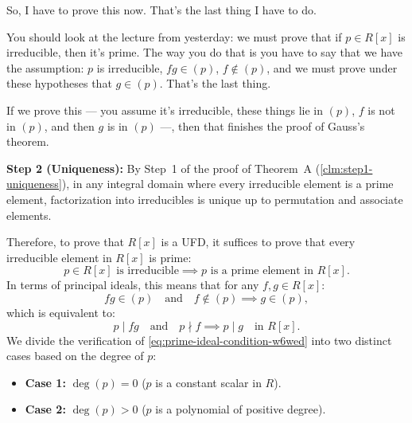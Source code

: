 \begin{proofWrapper}
\begin{speech}[00:31:28 - 00:33:17]
So, I have to prove this now. That's the last thing I have to do.

You should look at the lecture from yesterday: we must prove that if $p \in R[x]$ is irreducible,  then it's prime. The way you do that is you have to say that we have the assumption: $p$ is irreducible, $fg \in (p)$,  $f \notin (p)$,  and we must prove under these hypotheses that $g \in (p)$.  That's the last thing.

If we prove this --- you assume it's irreducible, these things lie in $(p)$, $f$ is not in $(p)$, and then $g$ is in $(p)$ ---, then that finishes the proof of Gauss's theorem.
\end{speech}

\begin{content}
\textbf{Step 2 (Uniqueness):}
By Step~1 of the proof of Theorem~A (\cref{clm:step1-uniqueness}), in any integral domain where every irreducible element is a prime element, factorization into irreducibles is unique up to permutation and associate elements.

Therefore, to prove that $R[x]$ is a UFD, it suffices to prove that every irreducible element in $R[x]$ is prime:
\begin{equation}\label{eq:irred-implies-prime-goal}
p \in R[x] \text{ is irreducible} \implies p \text{ is a prime element in } R[x].
\end{equation}
In terms of principal ideals, this means that for any $f, g \in R[x]$:
\begin{equation}\label{eq:prime-ideal-condition-w6wed}
fg \in (p) \quad \text{and} \quad f \notin (p) \implies g \in (p),
\end{equation}
which is equivalent to:
\[
p \mid fg \quad \text{and} \quad p \nmid f \implies p \mid g \quad \text{in } R[x].
\]
We divide the verification of \eqref{eq:prime-ideal-condition-w6wed} into two distinct cases based on the degree of $p$:
\begin{itemize}
    \item \textbf{Case 1:} $\deg(p) = 0$ ($p$ is a constant scalar in $R$).
    \item \textbf{Case 2:} $\deg(p) > 0$ ($p$ is a polynomial of positive degree).
\end{itemize}
\end{content}


\end{proofWrapper}
